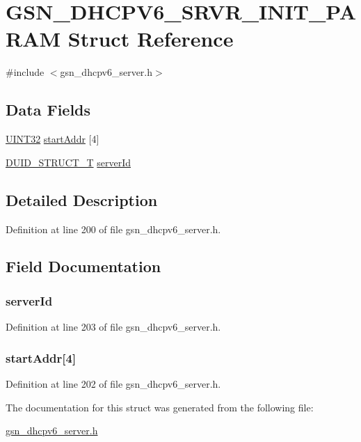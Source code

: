 \hypertarget{a00048}{
\section{GSN\_\-DHCPV6\_\-SRVR\_\-INIT\_\-PARAM Struct Reference}
\label{a00048}
}


{\ttfamily \#include $<$gsn\_\-dhcpv6\_\-server.h$>$}

\subsection*{Data Fields}
\begin{DoxyCompactItemize}
\item 
\hyperlink{a00660_gae1e6edbbc26d6fbc71a90190d0266018}{UINT32} \hyperlink{a00048_a8f781536a849f72b70b708d5440cdb0c}{startAddr} \mbox{[}4\mbox{]}
\item 
\hyperlink{a00017}{DUID\_\-STRUCT\_\-T} \hyperlink{a00048_a21dfcbd048f42b506500600ce9be2897}{serverId}
\end{DoxyCompactItemize}


\subsection{Detailed Description}


Definition at line 200 of file gsn\_\-dhcpv6\_\-server.h.



\subsection{Field Documentation}
\hypertarget{a00048_a21dfcbd048f42b506500600ce9be2897}{
\subsubsection[{serverId}]{ {\bf serverId}}}
\label{a00048_a21dfcbd048f42b506500600ce9be2897}


Definition at line 203 of file gsn\_\-dhcpv6\_\-server.h.

\hypertarget{a00048_a8f781536a849f72b70b708d5440cdb0c}{
\subsubsection[{startAddr}]{ {\bf startAddr}\mbox{[}4\mbox{]}}}
\label{a00048_a8f781536a849f72b70b708d5440cdb0c}


Definition at line 202 of file gsn\_\-dhcpv6\_\-server.h.



The documentation for this struct was generated from the following file:\begin{DoxyCompactItemize}
\item 
\hyperlink{a00483}{gsn\_\-dhcpv6\_\-server.h}\end{DoxyCompactItemize}
